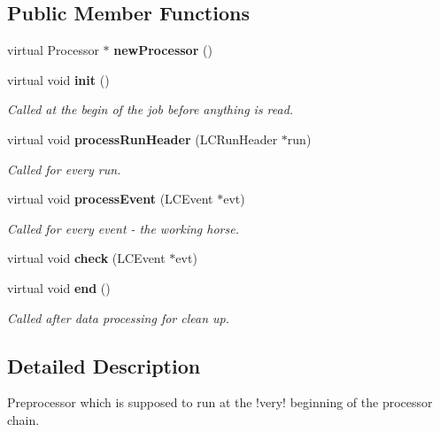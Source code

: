 \subsection*{Public Member Functions}
\begin{DoxyCompactItemize}
\item 
virtual Processor $\ast$ {\bfseries new\-Processor} ()\label{classmarlin_1_1TBTrackRemover_aabd6f4686ad80cd4dc5c00ad485532ab}

\item 
virtual void {\bf init} ()
\begin{DoxyCompactList}\small\item\em Called at the begin of the job before anything is read. \end{DoxyCompactList}\item 
virtual void {\bf process\-Run\-Header} (L\-C\-Run\-Header $\ast$run)\label{classmarlin_1_1TBTrackRemover_a7a4a783bba99c63bf4dfd424a39b461a}

\begin{DoxyCompactList}\small\item\em Called for every run. \end{DoxyCompactList}\item 
virtual void {\bf process\-Event} (L\-C\-Event $\ast$evt)\label{classmarlin_1_1TBTrackRemover_a6a9ccb473b3383d1ccb978e3ba8a7760}

\begin{DoxyCompactList}\small\item\em Called for every event -\/ the working horse. \end{DoxyCompactList}\item 
virtual void {\bfseries check} (L\-C\-Event $\ast$evt)\label{classmarlin_1_1TBTrackRemover_a24007dc2befc665be3688fc38683e002}

\item 
virtual void {\bf end} ()\label{classmarlin_1_1TBTrackRemover_af53b200afa75c5e10cc2fe2ccb19672b}

\begin{DoxyCompactList}\small\item\em Called after data processing for clean up. \end{DoxyCompactList}\end{DoxyCompactItemize}


\subsection{Detailed Description}
Preprocessor which is supposed to run at the !very! beginning of the processor chain. 

